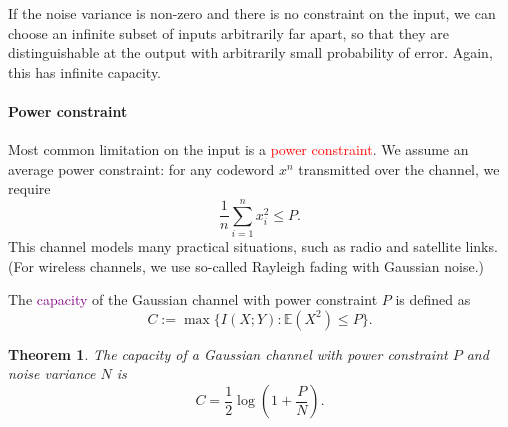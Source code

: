 \documentclass[a4paper, 11pt, openany]{book}
\numberwithin{equation}{section}
\theoremstyle{plain}
\newtheorem{theorem}	[equation]	{Theorem}
\theoremstyle{definition}
\newcommand{\expectation}{\mathbb{E}}
\newcommand{\Important}[1]{\textcolor{red}{#1}}
\newcommand{\Define}[1]{\textcolor{purple}{#1}}
\newcommand{\alphabet}[1]{\mathcal{#1}}
\begin{document}
If the noise variance is non-zero and there is no constraint on the input, we can choose an infinite subset of inputs arbitrarily far apart, so that they are distinguishable at the output with arbitrarily small probability of error. Again, this has infinite capacity.


\paragraph{Power constraint}
Most common limitation on the input is a \Important{power constraint}. We assume an average power constraint: for any codeword $x^n$ transmitted over the channel, we require
$$
	\frac{1}{n} \sum_{i=1}^n x_i^2 \le P.
$$
This channel models many practical situations, such as radio and satellite links. (For wireless channels, we use so-called Rayleigh fading with Gaussian noise.)


The \Define{capacity} of the Gaussian channel with power constraint $P$ is defined as
\[
	C := \max \{I(X;Y) : \expectation(X^2) \le P \}.
\]

\begin{theorem}
The capacity of a Gaussian channel with power constraint $P$ and noise variance $N$ is
$$
	C = \frac{1}{2} \log \left( 1 + \frac{P}{N} \right).
$$
\end{theorem}






% 


\end{document}
